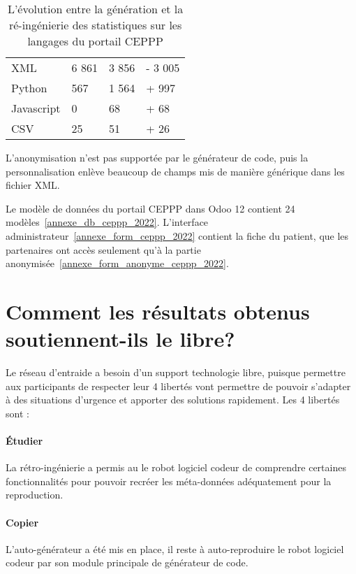 \begin{table}[htb]
\caption{L'évolution entre la génération et la ré-ingénierie des statistiques sur les langages du portail CEPPP}
\centering
\begin{tabular}{|l|l|l|l|}

\hline
\cellcolor[HTML]{d9d9d9}{\textbf{Langage}} & \cellcolor[HTML]{d9d9d9}{\# Ligne extrait} & \cellcolor[HTML]{d9d9d9}{\# Ligne personnalisé} & \cellcolor[HTML]{d9d9d9}{\# Diff}\\\hline

XML & 6 861 & 3 856 & - 3 005\\\hline
Python & 567 & 1 564 & + 997\\\hline
Javascript & 0 & 68 & + 68\\\hline
CSV & 25 & 51 & + 26\\\hline

\end{tabular}
\label{tab:stat_code_portail_ceppp}
\end{table}

L'anonymisation n'est pas supportée par le générateur de code, puis la personnalisation enlève beaucoup de champs mis de manière générique dans les fichier XML. 

Le modèle de données du portail CEPPP dans Odoo 12 contient 24 modèles~\ref{annexe_db_ceppp_2022}. L'interface administrateur~\ref{annexe_form_ceppp_2022} contient la fiche du patient, que les partenaires ont accès seulement qu'à la partie anonymisée~\ref{annexe_form_anonyme_ceppp_2022}.


\section{Comment les résultats obtenus soutiennent-ils le libre?}
Le réseau d’entraide a besoin d’un support technologie libre, puisque permettre aux participants de respecter leur 4 libertés vont permettre de pouvoir s’adapter à des situations d’urgence et apporter des solutions rapidement. Les 4 libertés sont :

\paragraph{Étudier}
La rétro-ingénierie a permis au le robot logiciel codeur de comprendre certaines fonctionnalités pour pouvoir recréer les méta-données adéquatement pour la reproduction.

\paragraph{Copier}
L’auto-générateur a été mis en place, il reste à auto-reproduire le robot logiciel codeur par son module principale de générateur de code.


